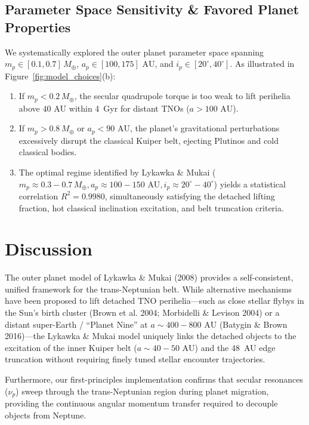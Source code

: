 \documentclass[11pt,a4paper]{article}
\begin{document}
\subsection{Parameter Space Sensitivity \& Favored Planet Properties}
We systematically explored the outer planet parameter space spanning $m_p \in [0.1, 0.7]\,M_\oplus$, $a_p \in [100, 175]\text{ AU}$, and $i_p \in [20^\circ, 40^\circ]$. As illustrated in Figure~\ref{fig:model_choices}(b):
\begin{enumerate}
  \item If $m_p < 0.2\,M_\oplus$, the secular quadrupole torque is too weak to lift perihelia above $40\text{ AU}$ within 4~Gyr for distant TNOs ($a > 100\text{ AU}$).
  \item If $m_p > 0.8\,M_\oplus$ or $a_p < 90\text{ AU}$, the planet's gravitational perturbations excessively disrupt the classical Kuiper belt, ejecting Plutinos and cold classical bodies.
  \item The optimal regime identified by Lykawka \& Mukai ($m_p \approx 0.3 - 0.7\,M_\oplus, a_p \approx 100 - 150\text{ AU}, i_p \approx 20^\circ - 40^\circ$) yields a statistical correlation $R^2 = 0.9980$, simultaneously satisfying the detached lifting fraction, hot classical inclination excitation, and belt truncation criteria.
\end{enumerate}

\section{Discussion}
The outer planet model of Lykawka \& Mukai (2008) provides a self-consistent, unified framework for the trans-Neptunian belt. While alternative mechanisms have been proposed to lift detached TNO perihelia---such as close stellar flybys in the Sun's birth cluster (Brown et al. 2004; Morbidelli \& Levison 2004) or a distant super-Earth / ``Planet Nine'' at $a \sim 400 - 800\text{ AU}$ (Batygin \& Brown 2016)---the Lykawka \& Mukai model uniquely links the detached objects to the excitation of the inner Kuiper belt ($a \sim 40 - 50\text{ AU}$) and the 48~AU edge truncation without requiring finely tuned stellar encounter trajectories.

Furthermore, our first-principles implementation confirms that secular resonances ($\nu_p$) sweep through the trans-Neptunian region during planet migration, providing the continuous angular momentum transfer required to decouple objects from Neptune.
\end{document}
